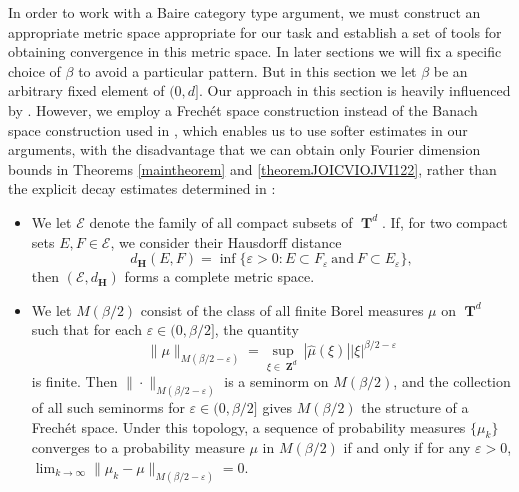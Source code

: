 \documentclass[12pt,reqno]{article}
\numberwithin{equation}{section}
\DeclareMathOperator{\ZZ}{\mathbf{Z}}
\DeclareMathOperator{\TT}{\mathbf{T}}
\numberwithin{theorem}{section}
\begin{document}
In order to work with a Baire category type argument, we must construct an appropriate metric space appropriate for our task and establish a set of tools for obtaining convergence in this metric space. In later sections we will fix a specific choice of $\beta$ to avoid a particular pattern. But in this section we let $\beta$ be an arbitrary fixed element of $(0,d]$. Our approach in this section is heavily influenced by \cite{Korner2}. However, we employ a Frech\'{e}t space construction instead of the Banach space construction used in \cite{Korner2}, which enables us to use softer estimates in our arguments, with the disadvantage that we can obtain only Fourier dimension bounds in Theorems \ref{maintheorem} and \ref{theoremJOICVIOJVI122}, rather than the explicit decay estimates determined in \cite{Korner2}:
%
\begin{itemize}
    \item We let $\mathcal{E}$ denote the family of all compact subsets of $\TT^d$. If, for two compact sets $E,F \in \mathcal{E}$, we consider their Hausdorff distance
    \[ d_\mathbf{H}(E,F) = \inf \{ \varepsilon > 0 : E \subset F_\varepsilon\ \text{and}\ F \subset E_\varepsilon \}, \]
    then $(\mathcal{E},d_\mathbf{H})$ forms a complete metric space. %

    \item We let $M(\beta/2)$ consist of the class of all finite Borel measures $\mu$ on $\TT^d$ such that for each $\varepsilon \in (0,\beta/2]$, the quantity
    \[ \| \mu \|_{M(\beta/2 - \varepsilon)} = \sup_{\xi \in \ZZ^d} |\widehat{\mu}(\xi)| |\xi|^{\beta/2 - \varepsilon} \]
    is finite. Then $\| \cdot \|_{M(\beta/2 - \varepsilon)}$ is a seminorm on $M(\beta/2)$, and the collection of all such seminorms for $\varepsilon \in (0,\beta/2]$ gives $M(\beta/2)$ the structure of a Frech\'{e}t space. Under this topology, a sequence of probability measures $\{ \mu_k \}$ converges to a probability measure $\mu$ in $M(\beta/2)$ if and only if for any $\varepsilon > 0$, $\lim_{k \to \infty} \| \mu_k - \mu \|_{M(\beta/2 - \varepsilon)} = 0$.
\end{itemize}
\end{document}
